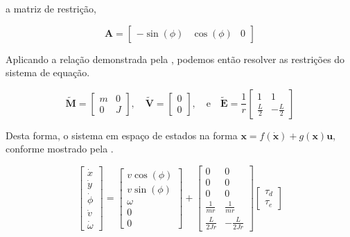 \noindent a matriz de restrição,

\begin{equation*}
    \mathbf{A} = 
    \begin{bmatrix}
        -\sin(\phi) & \cos(\phi) & 0
    \end{bmatrix}
\end{equation*}

Aplicando a relação demonstrada pela , podemos então resolver as restrições do sistema de equação.

\begin{equation*}
    \mathbf{\tilde{M}} = 
    \begin{bmatrix}
        m & 0 \\
        0 & J
    \end{bmatrix}, \quad
    \mathbf{\tilde{V}} = 
    \begin{bmatrix}
        0 \\ 0
    \end{bmatrix}, \quad \text{e} \quad
    \mathbf{\tilde{E}} = \frac{1}{r}
    \begin{bmatrix}
        1 & 1\\
        \displaystyle\frac{L}{2} & - \displaystyle\frac{L}{2}
    \end{bmatrix}
\end{equation*}

Desta forma, o sistema em espaço de estados na forma $\mathbf{x} = f(\mathbf{\dot{x}}) + g(\mathbf{x})\mathbf{u}$, conforme mostrado
pela .

\begin{equation}
    \begin{bmatrix}
        \dot{x} \\ \dot{y} \\ \dot{\phi} \\ \dot{v} \\ \dot{\omega}
    \end{bmatrix} = 
    \begin{bmatrix}
        v\cos(\phi) \\ v\sin(\phi) \\ \omega \\ 0 \\ 0
    \end{bmatrix} + 
    \begin{bmatrix}
        0 & 0 \\
        0 & 0 \\
        0 & 0 \\
        \frac{1}{mr} & \frac{1}{mr} \\
        \frac{L}{2Jr} & -\frac{L}{2Jr}
    \end{bmatrix}
    \begin{bmatrix}
        \tau_d \\ \tau_e
    \end{bmatrix}
    \label{eq:fullmodel}
\end{equation}

